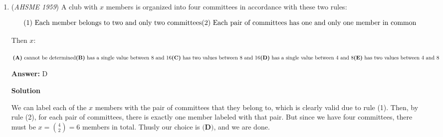 \begin{enumerate}
	\item (\textit{AHSME 1959}) A club with $x$ members is organized into four committees in accordance with these two rules:


 
 \[\text{(1)}\ \textup{Each member belongs to two and only two committees}\qquad \\ \text{(2)}\ \textup{Each pair of committees has one and only one member in common}\]


 Then $x$:


 $\textbf{(A)} \ \textup{cannot be determined} \qquad \\ \textbf{(B)} \ \textup{has a single value between 8 and 16} \qquad \\ \textbf{(C)} \ \textup{has two values between 8 and 16} \qquad \\ \textbf{(D)} \ \textup{has a single value between 4 and 8} \qquad \\ \textbf{(E)} \ \textup{has two values between 4 and 8}$

 \textbf{Answer: }D



\textbf{Solution}

We can label each of the $x$ members with the pair of committees that they belong to, which is clearly valid due to rule (1). Then, by rule (2), for each pair of committees, there is exactly one member labeled with that pair. But since we have four committees, there must be $x = \binom{4}{2} = 6$ members in total. Thusly our choice is $\boxed{\textbf{(D)}}$, and we are done.

 


\end{enumerate}